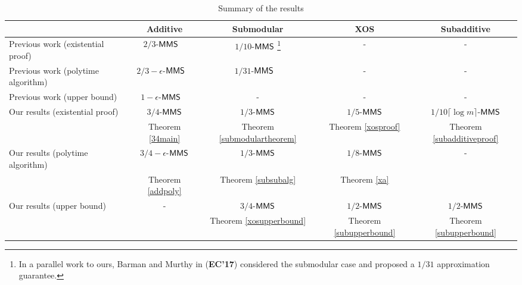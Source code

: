 \begin{table}[t]
	\caption{Summary of the results}
	\hspace{-1cm}\begin{tabular}{|l|c|c|c|c|}
		\hline
		& Additive & Submodular & XOS & Subadditive\\
		\hline
		Previous work (existential proof) & $2/3$-$\mathsf{MMS}$  ~\cite{Procaccia:first} & $1/10$-$\mathsf{MMS}$ \cite{barman2017approximation}\footnote{In a parallel work to ours, Barman and Murthy in \cite{barman2017approximation} (\textbf{EC'17}) considered the submodular case and proposed a $1/31$ approximation guarantee.}&- &-\\
		Previous work (polytime algorithm) &  $2/3-\epsilon$-$\mathsf{MMS}$  ~\cite{amanatidis2015approximation} & $1/31$-$\mathsf{MMS}$ ~\cite{barman2017approximation} & - & -\\
		Previous work (upper bound) & $1-\epsilon$-$\mathsf{MMS}$ ~\cite{Procaccia:first} & - & - & -\\
		\hline
		\color{magenta}Our results \color{black} (existential proof) & $3/4$-$\mathsf{MMS}$ & $1/3$-$\mathsf{MMS}$ & $1/5$-$\mathsf{MMS}$  & $1/10 \lceil\log m\rceil$-$\mathsf{MMS}$ \\
		& \color{magenta}Theorem \ref{34main}\color{black} & \color{magenta}Theorem \ref{submodulartheorem}\color{black}& \color{magenta} Theorem \ref{xosproof} \color{black}& \color{magenta} Theorem \ref{subadditiveproof} \color{black}\\
		\hline
		\color{magenta}Our results \color{black} (polytime algorithm) &  $3/4-\epsilon$-$\mathsf{MMS}$ & $1/3$-$\mathsf{MMS}$ & $1/8$-$\mathsf{MMS}$ & -\\
		
		& \color{magenta} Theorem \ref{addpoly} \color{black} & \color{magenta} Theorem \ref{subsubalg} \color{black} & \color{magenta} Theorem \ref{xa} \color{black} & \\
		
		\hline
		
		\color{magenta}Our results \color{black} (upper bound) & - & $3/4$-$\mathsf{MMS}$ & $1/2$-$\mathsf{MMS}$ & $1/2$-$\mathsf{MMS}$\\
		& & \color{magenta} Theorem \ref{xosupperbound} \color{black} & \color{magenta} Theorem \ref{subupperbound} \color{black} &  \color{magenta} Theorem \ref{subupperbound} \color{black} \\
 		\hline
	\end{tabular}
	
	
	
	\begin{tablenotes}
		\item
		\item
	\end{tablenotes}
	\label{resultstable}
\end{table}

